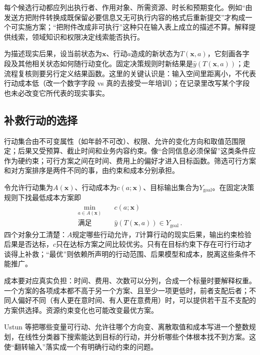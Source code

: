 每个候选行动都应列出执行者、作用对象、所需资源、时长和预期变化。例如“由发送方把附件转换成既保留必要信息又无可执行内容的格式后重新提交”才构成一个可实施方案；“把附件改成非可执行”这种只在输入表上成立的描述不算。解释提供线索，领域知识和权限决定线索能否执行。

为描述现实后果，设当前状态为$\bm x$、行动$a$造成的新状态为$T(\bm x,a)$，它刻画各字段及其他相关状态如何随行动变化。固定决策规则时新结果是$\hat y(T(\bm{x},a))$；走流程复核则要另行定义结果函数。这里的关键认识是：输入空间里距离小，不代表行动成本低（改一个数字字段 vs 真的去接受一年培训）；在记录里改写某个字段也未必改变它所代表的现实事实。

\subsection{补救行动的选择}
\label{sec:interpretability-recourse-action}

行动集合由不可变属性（如年龄不可改）、权限、允许的变化方向和取值范围限定；后果又受预算、截止时间和业务内容约束。像“合同信息必须保留”这类条件应作为硬约束；可行方案之间在时间、费用上的偏好才进入目标函数。筛选可行方案和对方案排序是两件不同的事，由约束和成本分别承担。

令允许行动集为$A(\bm x)$、行动成本为$c(a;\bm x)$、目标输出集合为$Y_{\mathrm{goal}}$。在固定决策规则下找最低成本方案即
\begin{equation}
 \begin{aligned}
 \min_{a\in A(\bm{x})}\quad &c(a;\bm{x})\\
 \text{满足}\quad &\hat y(T(\bm{x},a))\in Y_{\mathrm{goal}}\, .
 \end{aligned}
 \label{eq:interpretability-recourse}
\end{equation}
四个对象分工清楚：$A$规定哪些行动允许，$T$计算行动的现实后果，输出约束检验后果是否达标，$c$只在达标方案之间比较优劣。只有在目标约束下存在可行行动才谈得上补救；“最优”则依赖所声明的行动范围、后果模型和成本，脱离这些条件不能推广。

成本要对应真实负担：时间、费用、次数可以分列，合成一个标量时要解释权重。一个方案的各项成本都不高于另一个方案、且至少一项更低时，前者支配后者；不同人偏好不同（有人更在意时间、有人更在意费用）时，可以提供若干互不支配的方案供选择。资源约束变化也可能改变最优方案。

Ustun 等把哪些变量可行动、允许往哪个方向变、离散取值和成本写进一个整数规划，在线性分类器下搜索能达到目标的行动，并分析哪些个体根本找不到方案。这使“翻转输入”落实成一个有明确行动约束的问题。

